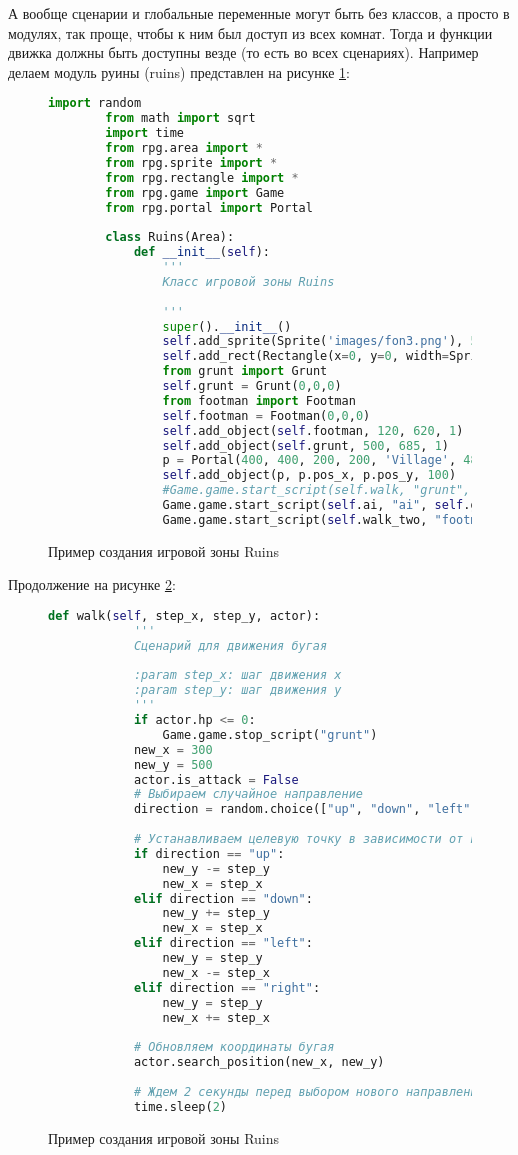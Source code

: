А вообще сценарии и глобальные переменные могут быть без классов, а просто в модулях, так проще, чтобы к ним был доступ из всех комнат. Тогда и функции движка должны быть доступны везде (то есть во всех сценариях). Например делаем модуль руины (ruins) представлен на рисунке \ref{ruins:image}:
\begin{figure}[H]
	\begin{lstlisting}[language=Python]
		import random
		from math import sqrt
		import time
		from rpg.area import *
		from rpg.sprite import *
		from rpg.rectangle import *
		from rpg.game import Game
		from rpg.portal import Portal
		
		class Ruins(Area):
			def __init__(self):
				'''
				Класс игровой зоны Ruins
				
				'''
				super().__init__()
				self.add_sprite(Sprite('images/fon3.png'), 590, 400, 0)
				self.add_rect(Rectangle(x=0, y=0, width=Sprite('images/fon3.png').image.width(), height=Sprite('images/fon3.png').image.height()))
				from grunt import Grunt
				self.grunt = Grunt(0,0,0)
				from footman import Footman
				self.footman = Footman(0,0,0)
				self.add_object(self.footman, 120, 620, 1)
				self.add_object(self.grunt, 500, 685, 1)
				p = Portal(400, 400, 200, 200, 'Village', 480, 100)
				self.add_object(p, p.pos_x, p.pos_y, 100)
				#Game.game.start_script(self.walk, "grunt", 50, 50)
				Game.game.start_script(self.ai, "ai", self.grunt)
				Game.game.start_script(self.walk_two, "footman", 50, 50)
\end{lstlisting}  
\caption{Пример создания игровой зоны Ruins}
\label{ruins:image}
\end{figure}
Продолжение на рисунке \ref{ruins5:image}:
\begin{figure}[H]
	\begin{lstlisting}[language=Python]	
		def walk(self, step_x, step_y, actor):
			'''
			Сценарий для движения бугая
			
			:param step_x: шаг движения x
			:param step_y: шаг движения y
			'''
			if actor.hp <= 0:
				Game.game.stop_script("grunt")
			new_x = 300
			new_y = 500
			actor.is_attack = False
			# Выбираем случайное направление
			direction = random.choice(["up", "down", "left", "right"])
			
			# Устанавливаем целевую точку в зависимости от направления
			if direction == "up":
				new_y -= step_y
				new_x = step_x
			elif direction == "down":
				new_y += step_y
				new_x = step_x
			elif direction == "left":
				new_y = step_y
				new_x -= step_x
			elif direction == "right":
				new_y = step_y
				new_x += step_x
			
			# Обновляем координаты бугая
			actor.search_position(new_x, new_y)
			
			# Ждем 2 секунды перед выбором нового направления
			time.sleep(2)
	\end{lstlisting}  
	\caption{Пример создания игровой зоны Ruins}
	\label{ruins5:image}
\end{figure}

